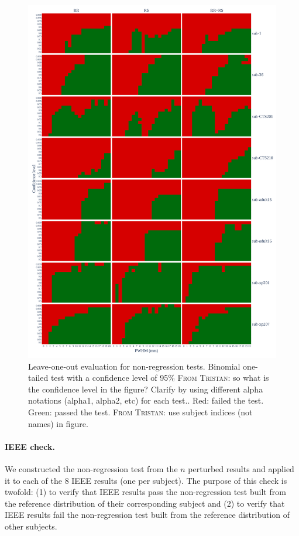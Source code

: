 \documentclass{article}
\newcommand{\TG}[1]{\color{blue}\textsc{From Tristan:} #1\color{black}\xspace}
\begin{document}
\begin{figure}
    \centering
    \includegraphics[width=\linewidth]{figures/exclude_mct_fwe_bonferroni.pdf}
    \caption{Leave-one-out evaluation for non-regression tests.
        Binomial one-tailed test with a confidence level of 95\% \TG{so what is the confidence level in the figure? Clarify by using different alpha notations (alpha1, alpha2, etc) for each test.}.
        Red: failed the test. Green: passed the test. \TG{use subject indices (not names) in figure.}}
    \label{fig:loo_bonferroni}
\end{figure}


\paragraph{IEEE check.} We constructed the non-regression test from the $n$ perturbed results and applied
it to each of the 8 IEEE results (one per subject).
The purpose of this check is twofold: (1) to verify that IEEE results pass the non-regression test built 
from the reference distribution of their corresponding subject and (2) to verify that IEEE results fail the non-regression test 
built from the reference distribution of other subjects.
\end{document}
